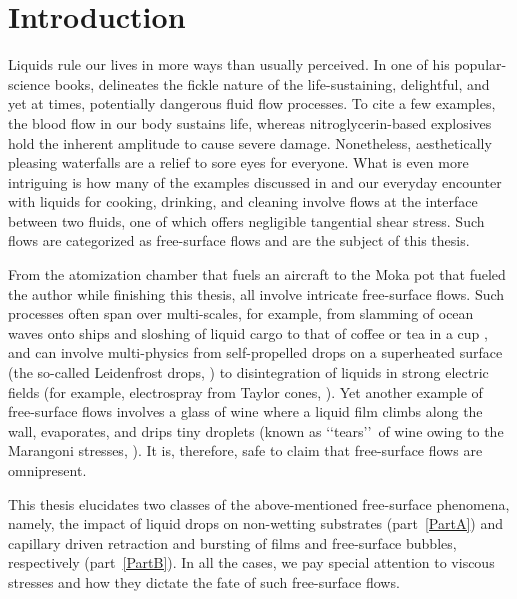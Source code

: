 \chapter*{Introduction}\label{chap:intro}

Liquids rule our lives in more ways than usually perceived. In one of his popular-science books, \citet{miodownik2019liquid} delineates the fickle nature of the life-sustaining, delightful, and yet at times, potentially dangerous fluid flow processes. To cite a few examples, the blood flow in our body sustains life, whereas nitroglycerin-based explosives hold the inherent amplitude to cause severe damage. Nonetheless, aesthetically pleasing waterfalls are a relief to sore eyes for everyone. What is even more intriguing is how many of the examples discussed in \citet{miodownik2019liquid} and our everyday encounter with liquids for cooking, drinking, and cleaning involve flows at the interface between two fluids, one of which offers negligible tangential shear stress. Such flows are categorized as free-surface flows \citep{tryggvason2011direct} and are the subject of this thesis. 

From the atomization chamber that fuels an aircraft to the Moka pot that fueled the author while finishing this thesis, all involve intricate free-surface flows. Such processes often span over multi-scales, for example, from slamming of ocean waves onto ships and sloshing of liquid cargo to that of coffee or tea in a cup \cite{UJThesis}, and can involve multi-physics from self-propelled drops on a superheated surface (the so-called Leidenfrost drops, \citep{Boerhaave1732, leidenfrost1756, quere2013leidenfrost}) to disintegration of liquids in strong electric fields (for example, electrospray from Taylor cones, \citep{taylor1964disintegration, ashgriz2011handbook}). Yet another example of free-surface flows involves a glass of wine where a liquid film climbs along the wall, evaporates, and drips tiny droplets (known as \lq\lq tears\rq\rq\ of wine owing to the Marangoni stresses, \citep{hosoi2001evaporative, book-degennes}). It is, therefore, safe to claim that free-surface flows are omnipresent. 

This thesis elucidates two classes of the above-mentioned free-surface phenomena, namely, the impact of liquid drops on non-wetting substrates (part~\ref{PartA}) and capillary driven retraction and bursting of films and free-surface bubbles, respectively (part~\ref{PartB}). In all the cases, we pay special attention to viscous stresses and how they dictate the fate of such free-surface flows.

